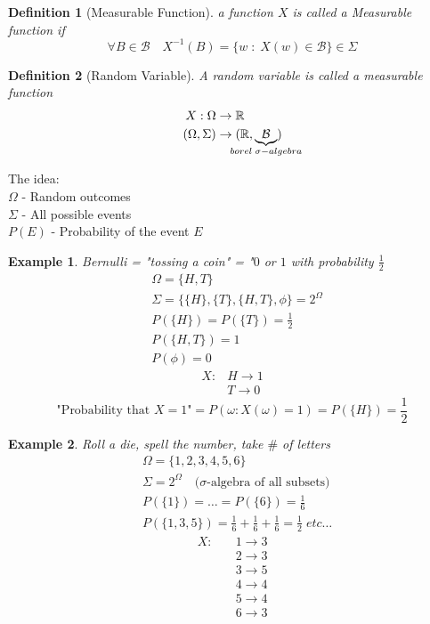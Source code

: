 \documentclass[12pt]{article}
\def\RR{\mathbb{R}}
\newtheorem{definition}{Definition}[section]
\newtheorem{example}{Example}[section]
\begin{document}
\begin{definition}[Measurable Function]
a function $X$ is called a Measurable function if 
\[\forall B \in \mathcal{B} \quad X^{-1}(B) = \{w\;:\; X(w) \in \mathcal{B} \} \in \Sigma \]
\end{definition}

\begin{definition}[Random Variable] 
A random variable is called a measurable function
\begin{align*}
X:\Omega &\rightarrow \RR\\
(\Omega, \Sigma) &\rightarrow (\RR , \underbrace{\mathcal{B}}_{\mathclap{borel \; \sigma -algebra}})
\end{align*}
\end{definition}

The idea:\\
$\Omega$ - Random outcomes\\
$\Sigma$ - All possible events\\
$P(E)$ - Probability of the event $E$

\begin{example}
Bernulli = "tossing a coin" = "$0$ or $1$ with probability $\frac{1}{2}$
\begin{align*}
&\Omega = \{H,T\}\\
&\Sigma = \{ \{H\},\{T\}, \{H,T\}, \phi \} = 2^{\Omega}\\
&P(\{H\}) = P(\{T\}) = \frac{1}{2}\\
&P(\{H,T\}) = 1\\
&P(\phi) = 0
\end{align*}
\begin{align*}
X:&H\rightarrow 1\\
&T\rightarrow 0
\end{align*}
\[\text{"Probability that $X=1$"} = P(\omega :X(\omega)=1) = P(\{H\}) = \frac{1}{2}\]
\end{example}

\begin{example}
Roll a die, spell the number, take $\#$ of letters
\begin{align*}
&\Omega = \{1,2,3,4,5,6\}\\
&\Sigma = 2^{\Omega} \quad \text{($\sigma$-algebra of all subsets)}\\
&P(\{1\})= \dots =P(\{6\}) = \frac{1}{6}\\
&P(\{1,3,5\}) = \frac{1}{6}+\frac{1}{6}+\frac{1}{6}= \frac{1}{2} \; etc \dots
\end{align*}
\begin{align*}
X:\quad &1\rightarrow 3\\
&2\rightarrow 3\\
&3\rightarrow 5\\
&4\rightarrow 4\\
&5\rightarrow 4\\
&6\rightarrow 3
\end{align*}
\end{example}
\end{document}
